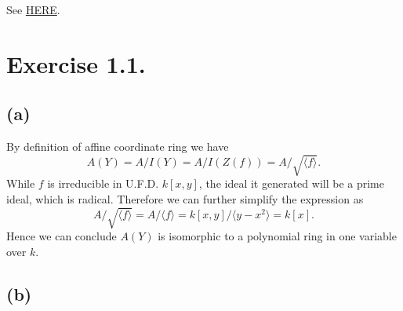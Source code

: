 See \href{https://math.stackexchange.com/questions/1292811/help-with-proposition-1-13-in-hartshornes-algebraic-geometry}{HERE}.

\section{Exercise 1.1.}

\subsection{(a)}

By definition of affine coordinate ring we have 
\[A(Y)=A/I(Y)=A/I(Z(f))=A/\sqrt{\langle f\rangle}.\]
While $f$ is irreducible in U.F.D. $k[x,y]$, the ideal it generated will be a prime ideal, which is radical. Therefore we can further simplify the expression as 
\[A/\sqrt{\langle f\rangle}=A/\langle f\rangle=k[x,y]/\langle y-x^2\rangle=k[x].\]
Hence we can conclude $A(Y)$ is isomorphic to a polynomial ring in one variable over $k$.

\subsection{(b)}
